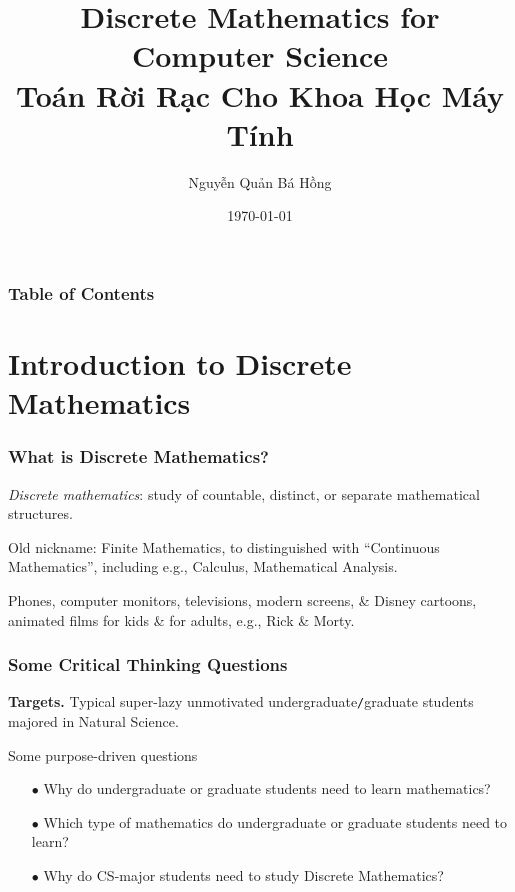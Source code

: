 \documentclass{beamer}
\title{Discrete Mathematics for Computer Science\\Toán Rời Rạc Cho Khoa Học Máy Tính}
\author{Nguyễn Quản Bá Hồng}
\institute{Presented at University of Management \& Technology of HCMC (UMT)}
\date{\today}
\begin{document}
\frame{\titlepage}
\begin{frame}
	\frametitle{Table of Contents}
	\tableofcontents
\end{frame}

\section{Introduction to Discrete Mathematics}

\begin{frame}
	\frametitle{What is Discrete Mathematics?}
	
	\begin{definition}
		\emph{Discrete mathematics}: study of countable, distinct, or separate mathematical structures.
	\end{definition}
	Old nickname: Finite Mathematics, to distinguished with ``Continuous Mathematics'', including e.g., Calculus, Mathematical Analysis.
	
	\begin{example}[Pixel]
		Phones, computer monitors, televisions, modern screens, \& Disney cartoons, animated films for kids \& for adults, e.g., Rick \& Morty.
	\end{example}
	
\end{frame}

\begin{frame}
	\frametitle{Some Critical Thinking Questions}
	{\bf Targets.} Typical super-lazy unmotivated undergraduate{\tt/}graduate students majored in Natural Science.
	\begin{block}{Some purpose-driven questions}
		\begin{itemize}\it
			\item[$\bullet$] Why do undergraduate or graduate students need to learn mathematics?
			\item[$\bullet$] Which type of mathematics do undergraduate or graduate students need to learn?
			\item[$\bullet$] Why do CS-major students need to study Discrete Mathematics?
		\end{itemize}
	\end{block}
\end{frame}
\end{document}
